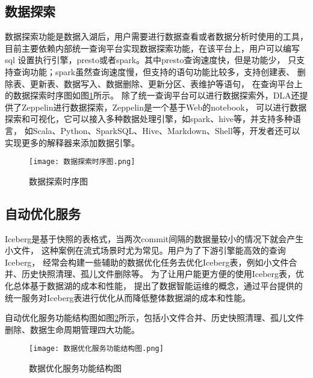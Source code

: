 \subsection{数据探索}

数据探索功能是数据入湖后，用户需要进行数据查看或者数据分析时使用的工具，
目前主要依赖内部统一查询平台实现数据探索功能，在该平台上，用户可以编写sql
设置执行引擎，presto或者spark。其中presto查询速度快，但是功能少，
只支持查询功能；spark虽然查询速度慢，但支持的语句功能比较多，支持创建表、
删除表、更新表、数据写入、数据删除、更新分区、表维护等语句，
在查询平台上的数据探索时序图如图\ref{fig:数据探索时序图}所示。
除了统一查询平台可以进行数据探索外，DLA还提供了Zeppelin进行数据探索，Zeppelin是一个基于Web的notebook，
可以进行数据探索和可视化，它可以接入多种数据处理引擎，如spark、hive等，并支持多种语言，
如Scala、Python、SparkSQL、Hive、Markdown、Shell等，开发者还可以实现更多的解释器来添加数据引擎。

\begin{figure}[H]
  \centering
  \texttt{[image: 数据探索时序图.png]}
  \caption{数据探索时序图}
  \label{fig:数据探索时序图}
\end{figure}

\subsection{自动优化服务}

Iceberg是基于快照的表格式，当两次commit间隔的数据量较小的情况下就会产生小文件，
这种案例在流式场景时尤为常见。用户为了下游引擎能高效的查询Iceberg，
经常会构建一些辅助的数据优化任务去优化Iceberg表，例如小文件合并、历史快照清理、孤儿文件删除等。
为了让用户能更方便的使用Iceberg表，优化总体基于数据湖的成本和性能，
提出了数据智能运维的概念，通过平台提供的统一服务对Iceberg表进行优化从而降低整体数据湖的成本和性能。

自动优化服务功能结构图如图\ref{fig:数据优化服务功能结构图}所示，包括小文件合并、历史快照清理、孤儿文件删除、数据生命周期管理四大功能。

\begin{figure}[H]
  \centering
  \texttt{[image: 数据优化服务功能结构图.png]}
  \caption{数据优化服务功能结构图}
  \label{fig:数据优化服务功能结构图}
\end{figure}

